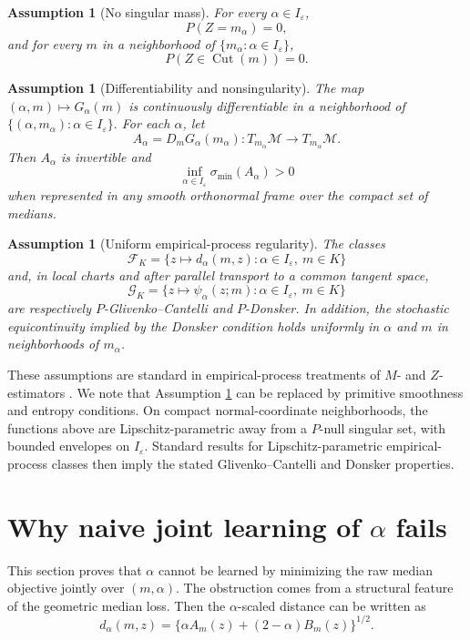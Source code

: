 \documentclass[11pt]{article}
\newtheorem{assumption}[theorem]{Assumption}
\DeclareMathOperator{\Cut}{Cut}
\newcommand{\M}{\mathcal M}
\newcommand{\eps}{\varepsilon}
\newcommand{\1}{\mathbf{1}}
\begin{document}
\begin{assumption}[No singular mass]\label{ass:no-singular}
For every $\alpha\in I_\eps$,
\[
 P(Z=m_\alpha)=0,
\]
and for every $m$ in a neighborhood of $\{m_\alpha:\alpha\in I_\eps\}$,
\[
 P(Z\in\Cut(m))=0.
\]
\end{assumption}

\begin{assumption}[Differentiability and nonsingularity]\label{ass:differentiability}
The map $(\alpha,m)\mapsto G_\alpha(m)$ is continuously differentiable in a neighborhood of
$
 \{(\alpha,m_\alpha):\alpha\in I_\eps\}.
$
For each $\alpha$, let
\[
 A_\alpha=D_mG_\alpha(m_\alpha):T_{m_\alpha}\M\to T_{m_\alpha}\M.
\]
Then $A_\alpha$ is invertible and
\[
 \inf_{\alpha\in I_\eps}\sigma_{\min}(A_\alpha)>0
\]
when represented in any smooth orthonormal frame over the compact set of medians.
\end{assumption}

\begin{assumption}[Uniform empirical-process regularity]\label{ass:empirical}
The classes
\[
 \mathcal F_K=\bigl\{z\mapsto d_\alpha(m,z):\alpha\in I_\eps,\ m\in K\bigr\}
\]
and, in local charts and after parallel transport to a common tangent space,
\[
 \mathcal G_K=\bigl\{z\mapsto \psi_\alpha(z;m):\alpha\in I_\eps,\ m\in K\bigr\}
\]
are respectively $P$-Glivenko--Cantelli and $P$-Donsker.  In addition, the stochastic equicontinuity implied by the Donsker condition holds uniformly in $\alpha$ and $m$ in neighborhoods of $m_\alpha$.
\end{assumption}

These assumptions are standard in empirical-process treatments of
$M$- and $Z$-estimators \citep{vandervaart_1998_AsymptoticStatistics, kosorok_2008_IntroductionEmpiricalProcesses}. We note that Assumption \ref{ass:empirical} can be replaced by primitive smoothness and entropy conditions.  On compact normal-coordinate neighborhoods, the functions above are Lipschitz-parametric away from a $P$-null singular set, with bounded envelopes on $I_\eps$.  Standard results for Lipschitz-parametric empirical-process classes then imply the stated Glivenko--Cantelli and Donsker properties.



\section{Why naive joint learning of $\alpha$ fails}\label{sec:nogo}

This section proves that $\alpha$ cannot be learned by minimizing the raw median
objective jointly over $(m,\alpha)$.  The obstruction comes from a structural
feature of the geometric median loss. Then the $\alpha$-scaled distance can be written as
\[
 d_\alpha(m,z)=\{\alpha A_m(z)+(2-\alpha)B_m(z)\}^{1/2}.
\]
\end{document}
